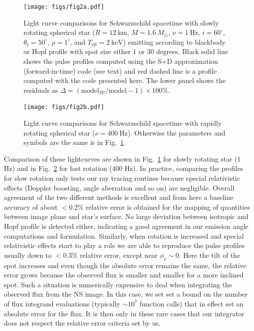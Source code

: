 \documentclass{aa}
\newcommand{\sch}{Schwarzschild }
\newcommand{\Msun}{\ensuremath{M_{\odot}}}
\begin{document}
\begin{figure}
\centering
\texttt{[image: figs/fig2a.pdf]}
\caption{\label{fig:sch_comp1}
  Light curve comparisons for \sch spacetime with slowly rotating spherical star ($R = 12~\mathrm{km}$, $M = 1.6~\Msun$, $\nu = 1~\mathrm{Hz}$, $i = 60^{\circ}$, $\theta_{\mathrm{s}} = 50^{\circ}$, $\rho = 1^{\circ}$, and $T_{\mathrm{eff}} = 2~\mathrm{keV}$) emitting according to blackbody or Hopf profile with spot size either $1$ or $30$ degrees.
    Black solid line shows the pulse profiles computed using the S+D approximation (forward-in-time) code (see text) and red dashed line is a profile computed with the code presented here.
  The lower panel shows the residuals as $\Delta = (\mathrm{model_{JP}}/\mathrm{model} -1) \times 100\%$.
}
\end{figure}

\begin{figure}
\centering
\texttt{[image: figs/fig2b.pdf]}
\caption{\label{fig:sch_comp400}
  Light curve comparisons for \sch spacetime with rapidly rotating spherical star ($\nu = 400~\mathrm{Hz}$).
  Otherwise the parameters and symbols are the same is in Fig.~\ref{fig:sch_comp1}.
}
\end{figure}


Comparison of these lightcurves are shown in Fig.~\ref{fig:sch_comp1} for slowly rotating star ($1$ Hz) and in Fig.~\ref{fig:sch_comp400} for fast rotation ($400$ Hz).
In practice, comparing the profiles for slow rotation only tests our ray tracing routines because special relativistic effects (Doppler boosting, angle aberration and so on) are negligible.
Overall agreement of the two different methods is excellent and from here a baseline accuracy of about $<0.2\%$ relative error is obtained for the mapping of quantities between image plane and star's surface.
No large deviation between isotropic and Hopf profile is detected either, indicating a good agreement in our emission angle computations and formulation.
Similarly, when rotation is increased and special relativistic effects start to play a role we are able to reproduce the pulse profiles usually down to $<0.3\%$ relative error, except near $\phi_{\mathrm{e}} \sim 0$.
Here the tilt of the spot increases and even though the absolute error remains the same, the relative error grows because the observed flux is smaller and smaller for a more inclined spot.
Such a situation is numerically expensive to deal when integrating the observed flux from the NS image.
In this case, we set set a bound on the number of flux integrand evaluations (typically $\sim 10^7$ function calls) that in effect set an absolute error for the flux.
It is then only in these rare cases that our integrator does not respect the relative error criteria set by us.
\end{document}
